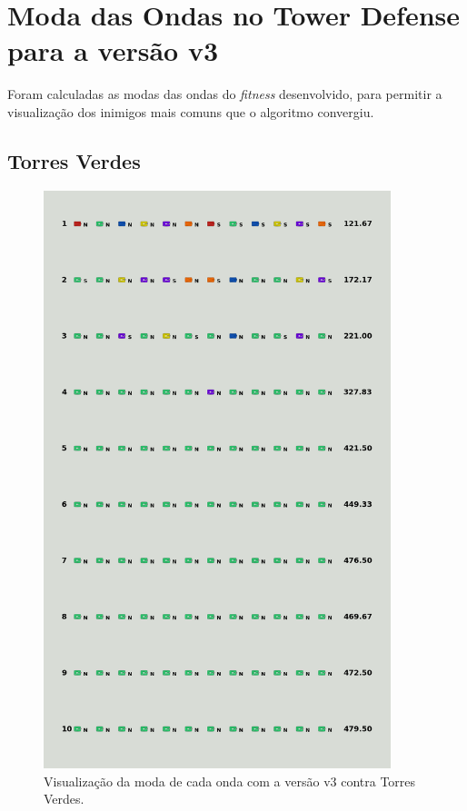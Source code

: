 \chapter{Moda das Ondas no Tower Defense para a versão v3}
\label{sec:apend-moda-td-v3}

Foram calculadas as modas das ondas do \textit{fitness} desenvolvido, para permitir a visualização dos inimigos mais comuns que o algoritmo convergiu.

\section{Torres Verdes}
\label{sec:apend-moda-td-g-v3}

\begin{figure}[H]
  \centering
  \includegraphics[width=0.9\textwidth]{figuras/td/td_allgreen_ai_mode_3_1.png}
  \caption{Visualização da moda de cada onda com a versão v3 contra Torres Verdes.}
  \label{fig:td-moda-green-3-1}
\end{figure}

